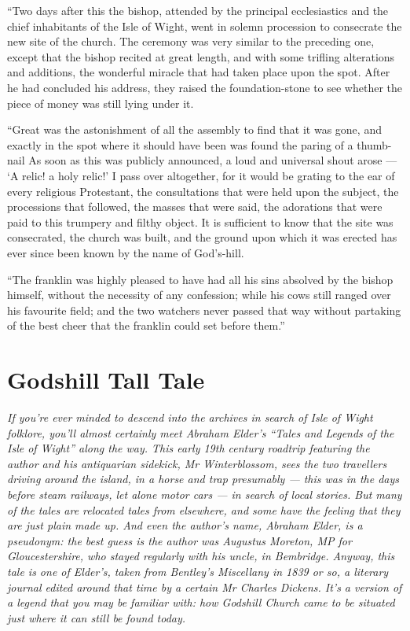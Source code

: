 \documentclass[
  12pt,
  a5paper,
  twoside]{book}
\begin{document}
``Two days after this the bishop, attended by the principal
ecclesiastics and the chief inhabitants of the Isle of Wight, went in
solemn procession to consecrate the new site of the church. The ceremony
was very similar to the preceding one, except that the bishop recited at
great length, and with some trifling alterations and additions, the
wonderful miracle that had taken place upon the spot. After he had
concluded his address, they raised the foundation-stone to see whether
the piece of money was still lying under it.

``Great was the astonishment of all the assembly to find that it was
gone, and exactly in the spot where it should have been was found the
paring of a thumb-nail As soon as this was publicly announced, a loud
and universal shout arose --- `A relic! a holy relic!' I pass over
altogether, for it would be grating to the ear of every religious
Protestant, the consultations that were held upon the subject, the
processions that followed, the masses that were said, the adorations
that were paid to this trumpery and filthy object. It is sufficient to
know that the site was consecrated, the church was built, and the ground
upon which it was erected has ever since been known by the name of
God's-hill.

``The franklin was highly pleased to have had all his sins absolved by
the bishop himself, without the necessity of any confession; while his
cows still ranged over his favourite field; and the two watchers never
passed that way without partaking of the best cheer that the franklin
could set before them.''


\chapter{Godshill Tall Tale}\label{godshill-tall-tale}

\emph{If you're ever minded to descend into the archives in search of
Isle of Wight folklore, you'll almost certainly meet Abraham Elder's
``Tales and Legends of the Isle of Wight'' along the way. This early
19th century roadtrip featuring the author and his antiquarian sidekick,
Mr Winterblossom, sees the two travellers driving around the island, in
a horse and trap presumably --- this was in the days before steam
railways, let alone motor cars --- in search of local stories. But many
of the tales are relocated tales from elsewhere, and some have the
feeling that they are just plain made up. And even the author's name,
Abraham Elder, is a pseudonym: the best guess is the author was Augustus
Moreton, MP for Gloucestershire, who stayed regularly with his uncle, in
Bembridge. Anyway, this tale is one of Elder's, taken from Bentley's
Miscellany in 1839 or so, a literary journal edited around that time by
a certain Mr Charles Dickens. It's a version of a legend that you may be
familiar with: how Godshill Church came to be situated just where it can
still be found today.}
\end{document}

